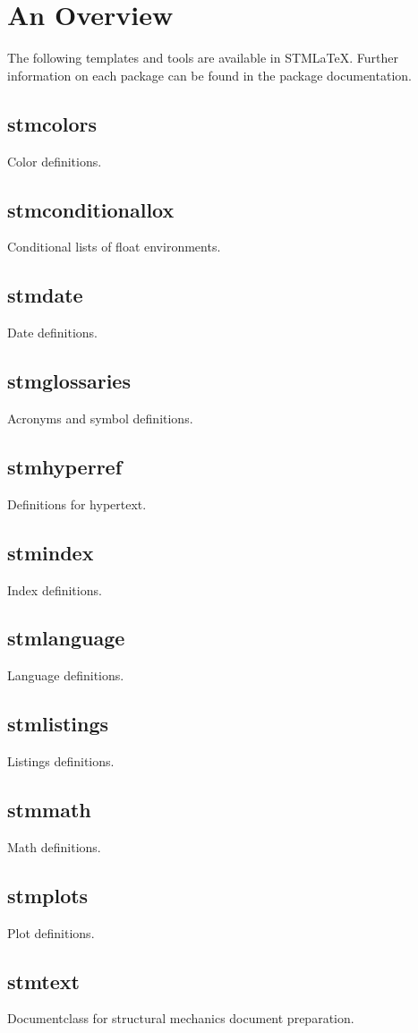 \documentclass[%
  type=article,%
  layout=koma,%
  page=false,%
  hyperref=true,%
  cleveref=true,%
  conditionallox=true,%
  conditionalloxnewpage=true,%
  date=true,%
  glossaries=true,%
  index=true,%
  math=true,%
  listings=true%
]{stmtext}
\author{Martin R\"{a}del}
\title{\stmlatex}
\subtitle{%
Overview and Installation Guide\\
Copyright \copyright{} \the\year{} DLR FA STM\\v\formatdate[versiondatestyle]{\DTMToday}\\
{\bigskip\small\normalfont Thankfully inspired by the RM-\LaTeX package guide.}
}
\date{\today}
\newcommand{\package}[1]{\subsection*{#1}\par\medskip\noindent\ignorespaces}
\newcommand{\stmlatex}{STM\LaTeX\xspace}
\begin{document}
\maketitle


\begin{abstract}
\stmlatex is a template collection for \LaTeX{} documents. All features and templates are created due to personal interest and are subject to change. All packages are tested using MiKTeX 2.9. However, they are considered as \enquote{as-is} and without any warranty. For questions, suggestion and feedback, please contact the author of the particular package.

\begin{center}
\color{red}
\bfseries
\stmlatex requires an up to date \LaTeX{} installation.
\end{center}
\end{abstract}


\tableofcontents


\section{An Overview}

The following templates and tools are available in \stmlatex. Further information on each package can be found in the package documentation.

\package{stmcolors}
Color definitions.

\package{stmconditionallox}
Conditional lists of float environments.

\package{stmdate}
Date definitions.

\package{stmglossaries}
Acronyms and symbol definitions.

\package{stmhyperref}
Definitions for hypertext.

\package{stmindex}
Index definitions.

\package{stmlanguage}
Language definitions.

\package{stmlistings}
Listings definitions.

\package{stmmath}
Math definitions.

\package{stmplots}
Plot definitions.

\package{stmtext}
Documentclass for structural mechanics document preparation.
\end{document}

